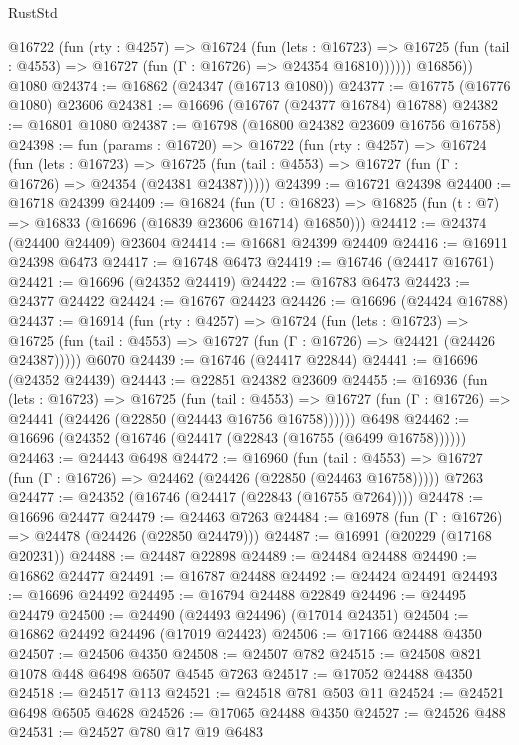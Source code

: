 \begin{lexlean}{RustStd}
\begin{coremodule}
          @16722
            (fun (rty : @4257) =>
            @16724
              (fun (lets : @16723) =>
              @16725 (fun (tail : @4553) => @16727 (fun (Γ : @16726) => @24354 @16810))))))
        @16856))
    @1080
@24374 := @16862 (@24347 (@16713 @1080))
@24377 := @16775 (@16776 @1080) @23606
@24381 := @16696 (@16767 (@24377 @16784) @16788)
@24382 := @16801 @1080
@24387 := @16798 (@16800 @24382 @23609 @16756 @16758)
@24398 := fun (params : @16720) =>
  @16722
    (fun (rty : @4257) =>
    @16724
      (fun (lets : @16723) =>
      @16725 (fun (tail : @4553) => @16727 (fun (Γ : @16726) => @24354 (@24381 @24387)))))
@24399 := @16721 @24398
@24400 := @16718 @24399
@24409 := @16824
    (fun (U : @16823) => @16825 (fun (t : @7) => @16833 (@16696 (@16839 @23606 @16714) @16850)))
@24412 := @24374 (@24400 @24409) @23604
@24414 := @16681 @24399 @24409
@24416 := @16911 @24398 @6473
@24417 := @16748 @6473
@24419 := @16746 (@24417 @16761)
@24421 := @16696 (@24352 @24419)
@24422 := @16783 @6473
@24423 := @24377 @24422
@24424 := @16767 @24423
@24426 := @16696 (@24424 @16788)
@24437 := @16914
    (fun (rty : @4257) =>
    @16724
      (fun (lets : @16723) =>
      @16725 (fun (tail : @4553) => @16727 (fun (Γ : @16726) => @24421 (@24426 @24387)))))
    @6070
@24439 := @16746 (@24417 @22844)
@24441 := @16696 (@24352 @24439)
@24443 := @22851 @24382 @23609
@24455 := @16936
    (fun (lets : @16723) =>
    @16725
      (fun (tail : @4553) =>
      @16727 (fun (Γ : @16726) => @24441 (@24426 (@22850 (@24443 @16756 @16758))))))
    @6498
@24462 := @16696 (@24352 (@16746 (@24417 (@22843 (@16755 (@6499 @16758))))))
@24463 := @24443 @6498
@24472 := @16960
    (fun (tail : @4553) => @16727 (fun (Γ : @16726) => @24462 (@24426 (@22850 (@24463 @16758)))))
    @7263
@24477 := @24352 (@16746 (@24417 (@22843 (@16755 @7264))))
@24478 := @16696 @24477
@24479 := @24463 @7263
@24484 := @16978 (fun (Γ : @16726) => @24478 (@24426 (@22850 @24479)))
@24487 := @16991 (@20229 (@17168 @20231))
@24488 := @24487 @22898
@24489 := @24484 @24488
@24490 := @16862 @24477
@24491 := @16787 @24488
@24492 := @24424 @24491
@24493 := @16696 @24492
@24495 := @16794 @24488 @22849
@24496 := @24495 @24479
@24500 := @24490 (@24493 @24496) (@17014 @24351)
@24504 := @16862 @24492 @24496 (@17019 @24423)
@24506 := @17166 @24488 @4350
@24507 := @24506 @4350
@24508 := @24507 @782
@24515 := @24508 @821 @1078 @448 @6498 @6507 @4545 @7263
@24517 := @17052 @24488 @4350
@24518 := @24517 @113
@24521 := @24518 @781 @503 @11
@24524 := @24521 @6498 @6505 @4628
@24526 := @17065 @24488 @4350
@24527 := @24526 @488
@24531 := @24527 @780 @17 @19 @6483

\end{coremodule}
\end{lexlean}

